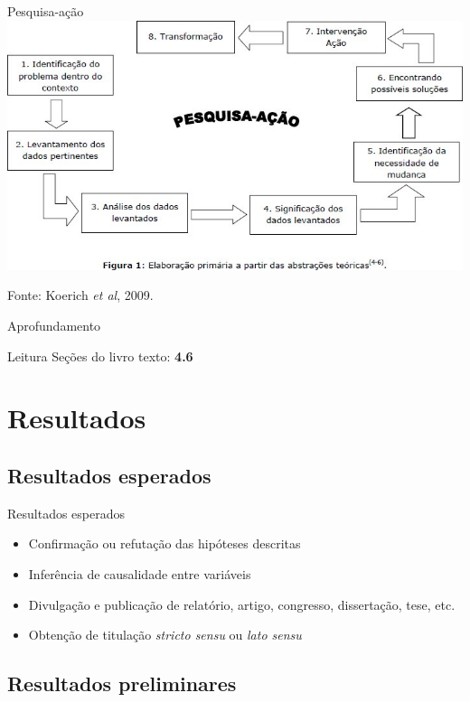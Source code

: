 \documentclass{beamer}
\begin{document}
\begin{frame}{Pesquisa-ação}
  \includegraphics[width=\textwidth]{ProjetoII/pesquisa-acao}

  Fonte: Koerich {\em et al}, 2009.
\end{frame}

\begin{frame}{Aprofundamento}
  \begin{block}{Leitura}
    Seções do livro texto: {\bf 4.6}
  \end{block}
\end{frame}


\section{Resultados}

\subsection{Resultados esperados}

\begin{frame}{Resultados esperados}
  \begin{itemize}
  \item Confirmação ou refutação das hipóteses descritas
  \item Inferência de causalidade entre variáveis
  \item Divulgação e publicação de relatório, artigo, congresso,
    dissertação, tese, etc.
  \item Obtenção de titulação {\em stricto sensu} ou {\em lato sensu}
  \end{itemize}
\end{frame}

\subsection{Resultados preliminares}
\end{document}
